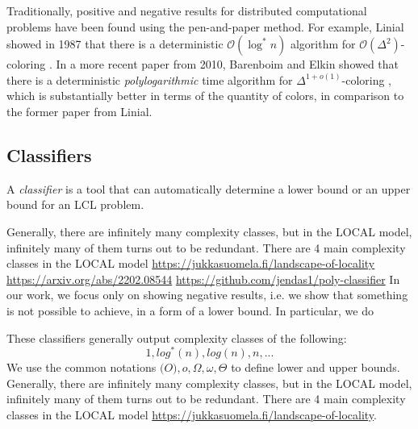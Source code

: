 Traditionally, positive and negative results for distributed computational problems have been found using the pen-and-paper method.
For example, Linial showed in 1987 that there is a deterministic \(\mathcal{O}(\log^* n)\) algorithm for \(\mathcal{O}(\Delta^2)\)-coloring \cite{DBLP:conf/focs/Linial87}.
In a more recent paper from 2010, Barenboim and Elkin showed that there is a deterministic \emph{polylogarithmic} time algorithm for \(\Delta^{1 + o(1)}\)-coloring \cite{DBLP:conf/podc/BarenboimE10}, which is substantially better in terms of the quantity of colors, in comparison to the former paper \cite{DBLP:conf/focs/Linial87} from Linial.
\subsection{Classifiers} \label{sec:prior_work:title_c}


A \emph{classifier} is a tool that can automatically determine a lower bound or an upper bound for an LCL problem.


Generally, there are infinitely many complexity classes, but in the LOCAL model, infinitely many of them turns out to be redundant.
There are 4 main complexity classes in the LOCAL model \url{https://jukkasuomela.fi/landscape-of-locality}
\url{https://arxiv.org/abs/2202.08544}
\url{https://github.com/jendas1/poly-classifier}
In our work, we focus only on showing negative results, i.e. we show that something is not possible to achieve, in a form of a lower bound.
In particular, we do

These classifiers generally output complexity classes of the following:
\[1, log^*(n), log(n), n, ...\]
\todo{}
We use the common notations \(\mathcal(O), o, \Omega, \omega, \Theta \) to define lower and upper bounds.
Generally, there are infinitely many complexity classes, but in the LOCAL model, infinitely many of them turns out to be redundant.
There are 4 main complexity classes in the LOCAL model \url{https://jukkasuomela.fi/landscape-of-locality}.

